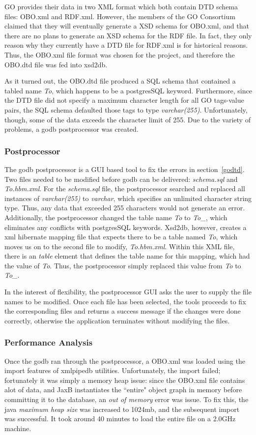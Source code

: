 GO provides their data in two XML format which both contain DTD schema files: OBO.xml and RDF.xml. However,
the members of the GO Consortium claimed that they will eventually generate a XSD schema for OBO.xml, and that there
are no plans to generate an XSD schema for the RDF file. In fact, they only reason why they currently have a DTD file
for RDF.xml is for historical reasons. Thus, the OBO.xml file format
was chosen for the project, and therefore the OBO.dtd file was fed into xsd2db.

As it turned out, the OBO.dtd file produced a SQL schema that contained a tabled name \emph{To}, which happens to be
a postgresSQL keyword. Furthermore, since the DTD file did not specify a maximum character length for all GO tags-value
pairs, the SQL schema defaulted those tags to type \emph{varchar(255)}. Unfortunately, though, some of the data exceeds the
character limit of 255. Due to the variety of problems, a godb postprocessor was created.

\subsubsection{Postprocessor}
The godb postprocessor is a GUI based tool to fix the errors in section~\ref{godtd}. Two files needed to be modified  before
godb can be delivered: \emph{schema.sql} and \emph{To.hbm.xml}. For the \emph{schema.sql} file, the postprocessor
searched and replaced all instances of \emph{varchar(255)} to \emph{varchar}, which specifies an unlimited character string type.
Thus, any data that exceeded 255 characters would not generate an error. Additionally,
the postprocessor changed the table name \emph{To} to  \emph{To\_}, which eliminates any conflicts with postgresSQL keywords.
Xsd2db, however,
creates a xml hibernate mapping file that expects there to be a table named \emph{To}, which moves us on to the second file to modify,
\emph{To.hbm.xml}. Within this XML file, there is an \emph{table} element that defines the table name for this mapping, which had the
value of \emph{To}. Thus, the postprocessor simply replaced this value from \emph{To} to \emph{To\_}.

In the interest of flexibility, the postprocessor GUI asks the user to supply the file names to be modified.
Once each file has been selected, the tools proceeds to fix the corresponding files and returns a success message
if the changes were done correctly, otherwise the application terminates without modifying the files.

\subsubsection{Performance Analysis}
Once the godb ran through the postprocessor, a OBO.xml was loaded using the import features of xmlpipedb utilities.
Unfortunately, the import failed; fortunately it was simply a memory heap issue: since the OBO.xml file contains alot of data, and
JaxB instantiates the ``entire" object graph in memory before committing it to the database, an \emph{out of memory} error was issue.
To fix this, the java \emph{maximum heap size} was increased to 1024mb, and the subsequent import was successful. It took
around 40 minutes to load the entire file on a 2.0GHz machine.

